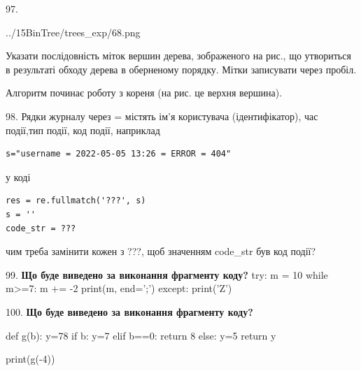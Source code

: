 \documentclass[11pt]{article}
\begin{document}
97. 

\begin{center}
	{../15BinTree/trees_exp/68.png}
\end{center}
Указати послідовність міток вершин дерева, зображеного на рис., що утвориться в результаті обходу дерева в оберненому порядку. Мітки записувати через пробіл.\par Алгоритм починає роботу з кореня (на рис. це верхня вершина).
\par\vspace{5mm}

98. 
Рядки журналу через = містять ім'я користувача (ідентифікатор), час події,тип події, код події, наприклад
\begin{verbatim}
s="username = 2022-05-05 13:26 = ERROR = 404"
\end{verbatim}
у коді 
\begin{verbatim}
res = re.fullmatch('???', s) 
s = ''
code_str = ??? 
\end{verbatim}
чим треба замінити кожен з ???, щоб значенням code\_str був код події? 


\par\vspace{5mm}

99. \textbf{Що буде виведено за виконання фрагменту коду?}
try:
    m = 10
    while m>=7:
        m += -2
    print(m, end=';')
except:
    print('Z')
\par\vspace{5mm}

100. \textbf{Що буде виведено за виконання фрагменту коду?}

def g(b):
    y=78
    if b: 
        y=7
    elif b==0:
         return 8
    else:
         y=5
    return y

print(g(-4))
\par\vspace{5mm}

\newpage
\end{document}
